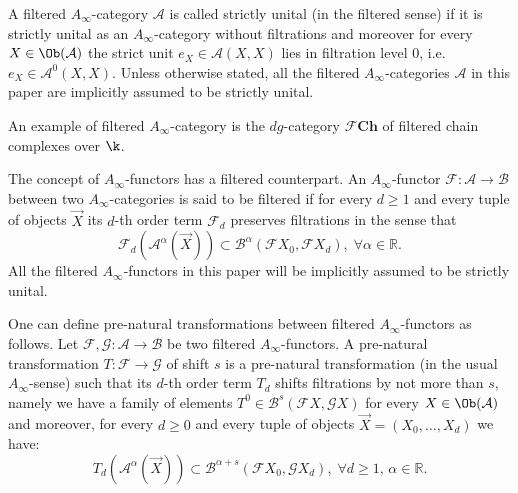 A filtered $A_{\infty}$-category $\mathcal{A}$ is called strictly
unital (in the filtered sense) if it is strictly unital as an
$A_{\infty}$-category without filtrations and moreover for every
$X \in \Ob(\mathcal{A})$ the strict unit $e_X \in \mathcal{A}(X,X)$
lies in filtration level $0$, i.e.~$e_X \in \mathcal{A}^0(X,X)$.
Unless otherwise stated, all the filtered $A_{\infty}$-categories
$\mathcal{A}$ in this paper are implicitly assumed to be strictly
unital.

An example of filtered $A_\infty$-category is the $dg$-category $\mathcal{F}\mathbf{Ch}$ of filtered chain complexes over $\k$.

The concept of $A_{\infty}$-functors has a filtered counterpart.  An
$A_{\infty}$-functor
$\mathcal{F}: \mathcal{A} \longrightarrow \mathcal{B}$ between two
$A_{\infty}$-categories is said to be filtered if for every $d \geq 1$
and every tuple of objects $\vec{X}$ its $d$-th order term
$\mathcal{F}_d$ preserves filtrations in the sense that
$$\mathcal{F}_d(\mathcal{A}^{\alpha}(\vec{X})) \subset
\mathcal{B}^{\alpha}(\mathcal{F}X_0, \mathcal{F}X_d), \; \forall
\alpha \in \mathbb{R}.$$ All the filtered $A_{\infty}$-functors in
this paper will be implicitly assumed to be strictly unital.

One can define pre-natural transformations between filtered
$A_{\infty}$-functors as follows.  Let
$\mathcal{F}, \mathcal{G}: \mathcal{A} \longrightarrow \mathcal{B}$ be
two filtered $A_{\infty}$-functors. A pre-natural transformation
$T: \mathcal{F} \longrightarrow \mathcal{G}$ of shift $s$ is a
pre-natural transformation (in the usual $A_{\infty}$-sense) such that
its $d$-th order term $T_d$ shifts filtrations by not more than $s$, namely we have
a family of elements
$T^0 \in \mathcal{B}^{s}(\mathcal{F} X, \mathcal{G}X)$ for every
$X \in \Ob(\mathcal{A})$ and moreover, for every $d \geq 0$ and every
tuple of objects $\vec{X} = (X_0, \ldots, X_d)$ we have:
$$T_d (\mathcal{A}^{\alpha}(\vec{X})) \subset
\mathcal{B}^{\alpha + s}(\mathcal{F}X_0, \mathcal{G}X_d), \; \forall d
\geq 1, \, \alpha \in \mathbb{R}.$$

